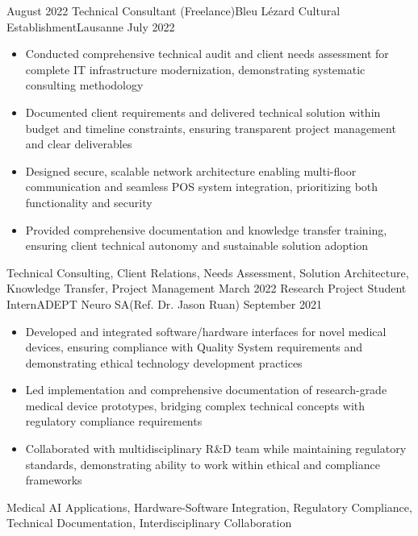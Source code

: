 \begin{experiences}
  \emptySeparator
  \experience
    {August 2022}   {Technical Consultant (Freelance)}{Bleu Lézard Cultural Establishment}{Lausanne}
    {July 2022} {
                      \begin{itemize}
                        \item Conducted comprehensive technical audit and client needs assessment for complete IT infrastructure modernization, demonstrating systematic consulting methodology
                        \item Documented client requirements and delivered technical solution within budget and timeline constraints, ensuring transparent project management and clear deliverables
                        \item Designed secure, scalable network architecture enabling multi-floor communication and seamless POS system integration, prioritizing both functionality and security
                        \item Provided comprehensive documentation and knowledge transfer training, ensuring client technical autonomy and sustainable solution adoption
                      \end{itemize}
                    }
                    {Technical Consulting, Client Relations, Needs Assessment, Solution Architecture, Knowledge Transfer, Project Management}
  \emptySeparator
  \experience
    {March 2022}   {Research Project Student Intern}{ADEPT Neuro SA}{(Ref. Dr. Jason Ruan)}
    {September 2021} {
                      \begin{itemize}
                        \item Developed and integrated software/hardware interfaces for novel medical devices, ensuring compliance with Quality System requirements and demonstrating ethical technology development practices
                        \item Led implementation and comprehensive documentation of research-grade medical device prototypes, bridging complex technical concepts with regulatory compliance requirements
                        \item Collaborated with multidisciplinary R\&D team while maintaining regulatory standards, demonstrating ability to work within ethical and compliance frameworks
                      \end{itemize}
                    }
                    {Medical AI Applications, Hardware-Software Integration, Regulatory Compliance, Technical Documentation, Interdisciplinary Collaboration}
  \emptySeparator

\end{experiences}
